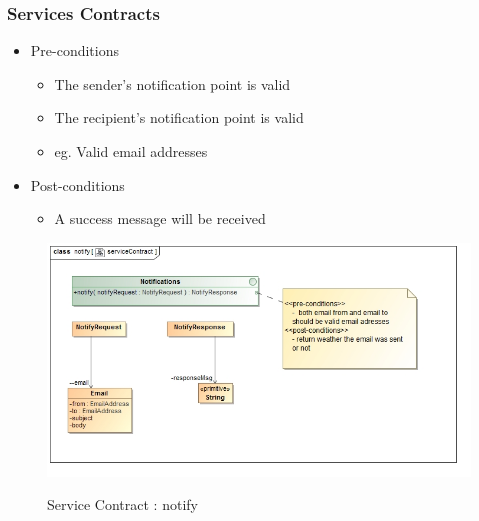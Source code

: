 \documentclass{article}
\begin{document}
		\subsubsection{Services Contracts}
			\begin{itemize}
			\item Pre-conditions
				\begin{itemize}
					\item The sender's notification point is valid
					\item The recipient's notification point is valid
					\item eg. Valid email addresses
				\end{itemize}
			\item Post-conditions
				\begin{itemize}
					\item A success message will be received 
				\end{itemize}
		\end{itemize}
		\begin{figure}[H]
		\includegraphics[width=\textwidth]{images/class__notify__serviceContract.jpg}  \\
		\caption{Service Contract : notify}
		\end{figure}
		
		
		
		


\pagebreak
\end{document}
